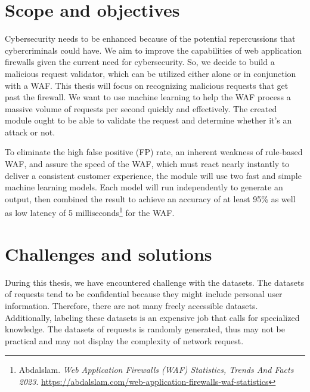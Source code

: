 \section{Scope and objectives}
\label{sec:objectives}
\hspace{0.5cm}Cybersecurity needs to be enhanced because of the potential repercussions that cybercriminals could have. We aim to improve the capabilities of web application firewalls given the current need for cybersecurity. So, we decide to build a malicious request validator, which can be utilized either alone or in conjunction with a WAF. This thesis will focus on recognizing malicious requests that get past the firewall. We want to use machine learning to help the WAF process a massive volume of requests per second quickly and effectively. The created module ought to be able to validate the request and determine whether it's an attack or not.

To eliminate the high false positive (FP) rate, an inherent weakness of rule-based WAF, and assure the speed of the WAF, which must react nearly instantly to deliver a consistent customer experience, the module will use two fast and simple machine learning models. Each model will run independently to generate an output, then combined the result to achieve an accuracy of at least 95\% as well as low latency of 5 milliseconds\footnote{Abdalslam. \textit{Web Application Firewalls (WAF) Statistics, Trends And Facts 2023}. 
\url{https://abdalslam.com/web-application-firewalls-waf-statistics}} for the WAF.

\section{Challenges and solutions}
\label{sec:challenges_and_solutions}
\hspace{0.5cm}During this thesis, we have encountered challenge with the datasets. The datasets of requests tend to be confidential because they might include personal user information. Therefore, there are not many freely accessible datasets. Additionally, labeling these datasets is an expensive job that calls for specialized knowledge. The datasets of requests is randomly generated, thus may not be practical and may not display the complexity of network request.

